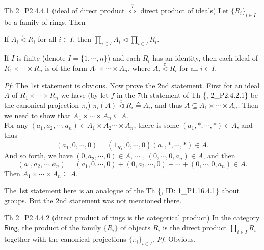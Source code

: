 \documentclass{article}
\newcommand{\nles}{\vartriangleleft}
\newcommand{\ideal}{\overset{\text{r}}{\nles}} %
\begin{document}
\begin{Th}{Th 2\_P2.4.4.1 (ideal of direct product $\overset{?}{\Longleftrightarrow}$ direct product of ideals)}
    Let $\{R_i\}_{i\in I}$ be a family of rings. Then
    \begin{compactenum}
        \item If $A_i\ideal R_i$ for all $i\in I$, then $\prod_{i\in I} A_i\ideal \prod_{i\in I} R_i$.
        \item If $I$ is finite (denote $I = \{1, \cdots, n\}$) and each $R_i$ has an identity, then each ideal of $R_1\times\cdots\times R_n$ is of the form $A_1\times\cdots\times A_n$, where $A_i\ideal R_i$ for all $i\in I$.
    \end{compactenum}
    \tcblower
    \textit{Pf}: The 1st statement is obvious. Now prove the 2nd statement. First for an ideal $A$ of $R_1\times\cdots\times R_n$ we have (by let $f$ in the 7th statement of Th \{, 2\_P2.4.2.1\} be the canonical projection $\pi_i$) $\pi_i(A)\ideal R_i\triangleq A_i$, and thus $A\subseteq A_1\times\cdots\times A_n$. Then we need to show that $A_1\times\cdots\times A_n\subseteq A$. \\
    For any $(a_1, a_2, \cdots, a_n)\in A_1\times A_2\cdots\times A_n$, there is some $(a_1, \ast, \cdots, \ast)\in A$, and thus
    $$ (a_1, 0, \cdots, 0) = (1_{R_1}, 0, \cdots, 0)(a_1, \ast, \cdots, \ast) \in A. $$
    And so forth, we have $(0, a_2, \cdots, 0)\in A$, \; $\cdots$ \;, $(0, \cdots, 0, a_n)\in A$, and then
    $$ (a_1, a_2, \cdots, a_n) = (a_1, 0, \cdots, 0) + (0, a_2, \cdots, 0) + \cdots + (0, \cdots, 0, a_n) \in A. $$
    Then $A_1\times\cdots\times A_n\subseteq A$. 
\end{Th}

\begin{Rmk}{}
    The 1st statement here is an analogue of the Th \{, ID: 1\_P1.16.4.1\} about groups. But the 2nd statement was not mentioned there.
\end{Rmk}

\begin{Th}{Th 2\_P2.4.4.2 (direct product of rings is the categorical product)}
    In the category $\mathsf{Ring}$, the product of the family $\{R_i\}$ of objects $R_i$ is the direct product $\prod_{i\in I} R_i$ together with the canonical projections $\{\pi_i\}_{i\in I}$.
    \tcblower
    \textit{Pf}: Obvious.
\end{Th}
\end{document}
